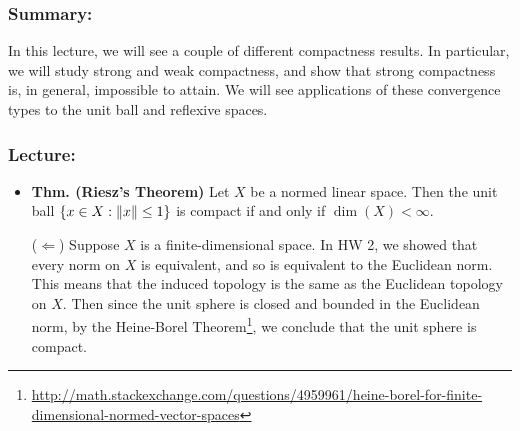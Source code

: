 \documentclass{article}
\begin{document}
\subsubsection{Summary:}
In this lecture, we will see a couple of different compactness results. In particular, we will study strong and weak compactness, and show that strong compactness is, in general, impossible to attain. We will see applications of these convergence types to the unit ball and reflexive spaces. 
\subsubsection{Lecture:}
\begin{itemize}
	\item \textbf{Thm. (Riesz's Theorem)} Let $X$ be a normed linear space. Then the unit ball $\{x \in X: \left\Vert x \right\Vert \leq 1\}$ is compact if and only if $\dim(X) < \infty$.
	
	\begin{solutions}
		($\Leftarrow$) Suppose $X$ is a finite-dimensional space. In HW 2, we showed that every norm on $X$ is equivalent, and so is equivalent to the Euclidean norm. This means that the induced topology is the same as the Euclidean topology on $X$. Then since the unit sphere is closed and bounded in the Euclidean norm, by the Heine-Borel Theorem\footnote{\href{http://math.stackexchange.com/questions/4959961/heine-borel-for-finite-dimensional-normed-vector-spaces}{http://math.stackexchange.com/questions/4959961/heine-borel-for-finite-dimensional-normed-vector-spaces}}, we conclude that the unit sphere is compact. 
		

\end{solutions}
\end{itemize}
\end{document}
